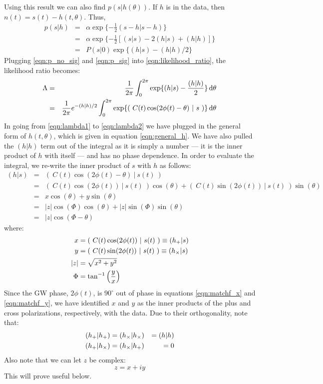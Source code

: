 Using this result we can also find $p(s|h(\theta))$. If $h$ is in the data, then $n(t) = s(t) - h(t, \theta)$. Thus,
\begin{eqnarray}
\label{eqn:p_sig}
p(s|h) & = & \alpha \exp\{ -\frac{1}{2} (s - h | s - h ) \} \nonumber \\
 & = & \alpha \exp\{ -\frac{1}{2} [ (s|s) - 2(h|s) + (h|h) ] \} \nonumber \\
 & = & P(s|0) \exp\{ (h|s) - (h|h)/2 \}
\end{eqnarray}
Plugging \ref{eqn:p_no_sig} and \ref{eqn:p_sig} into \ref{eqn:likelihood_ratio}, the likelihood ratio becomes:
\begin{eqnarray}
\label{eqn:lambda1}
\Lambda & = & \frac{1}{2\pi} \int_0^{2\pi} \exp\{ (h|s)- \frac{(h|h)}{2} \} \d\theta \\
\label{eqn:lambda2}
 & = & \frac{1}{2\pi} e^{-(h|h)/2} \int_0^{2\pi} \exp\{ (~C(t)\cos(2\phi(t) - \theta)~|~s~) \} \d\theta
\end{eqnarray}
In going from \ref{eqn:lambda1} to \ref{eqn:lambda2} we have plugged in the general form of $h(t, \theta)$, which is given in equation \ref{eqn:general_h}. We have also pulled the $(h|h)$ term out of the integral as it is simply a number --- it is the inner product of $h$ with itself --- and has no phase dependence. In order to evaluate the integral, we re-write the inner product of $s$ with $h$ as follows:
\begin{eqnarray}
\label{eqn:sh_in_z}
(h|s) & = &  (~C(t) \cos(2\phi(t) - \theta)~|~s(t)~) \nonumber \\
 & = & (~C(t)\cos(2\phi(t))~|~s(t)~) \cos(\theta) + (~C(t)\sin(2\phi(t))~|~s(t)~) \sin(\theta) \nonumber \\
 & = & x \cos(\theta) + y\sin(\theta) \nonumber \\
 & = & |z|\cos(\Phi)\cos(\theta) + |z|\sin(\Phi)\sin(\theta) \nonumber \\
 & = & |z|\cos(\Phi - \theta)
\end{eqnarray}
where:
\begin{align}
\label{eqn:matchf_x}
x &= (~C(t)\cos(2\phi(t))~|~s(t)~) \equiv (h_{\pls}|s) \\
\label{eqn:matchf_y}
y &= (~C(t)\sin(2\phi(t))~|~s(t)~) \equiv (h_{\crs}|s) \\
|z| &= \sqrt{ x^2 + y^2 } \\
\Phi &=  \tan^{-1}\left( \frac{y}{x} \right) 
\end{align}
Since the \ac{GW} phase, $2\phi(t)$, is $90^{\circ}$ out of phase in equations \ref{eqn:matchf_x} and \ref{eqn:matchf_y}, we have identified $x$ and $y$ as the inner products of the plus and cross polarizations, respectively, with the data. Due to their orthogonality, note that:
\begin{align}
(h_{+}|h_{+}) &= (h_{\times}|h_{\times}) &= (h|h) \\
(h_{+}|h_{\times}) &= (h_{\times}|h_{+}) &= 0
\end{align}
Also note that we can let $z$ be complex:
\begin{equation}
z = x + iy
\end{equation}
This will prove useful below.

